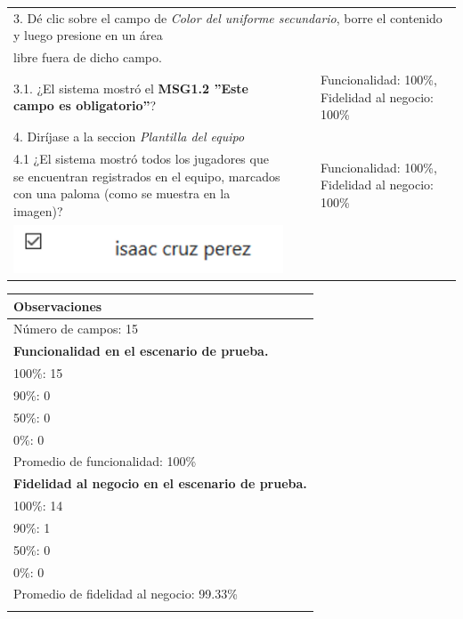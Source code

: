 \documentclass[oneside,10pt]{book}
\begin{document}
\begin{tabularx}{\textwidth}{ X l l X }
\multicolumn{4}{|l|}{3. Dé clic sobre el campo de \textit{Color del uniforme secundario}, borre el contenido y luego presione en un área}              \\
\multicolumn{4}{|l|}{libre fuera de dicho campo.}              \\ \hline
\multicolumn{1}{|X|}{3.1. ¿El sistema mostró el \textbf{MSG1.2 ''Este campo es obligatorio''}?} & \multicolumn{1}{l|}{}   & \multicolumn{1}{l|}{}   & \multicolumn{1}{X|}{Funcionalidad: 100\%, Fidelidad al negocio: 100\%}              \\ \hline

\multicolumn{4}{|l|}{4. Diríjase a la seccion \textit{Plantilla del equipo}}              \\ \hline
\multicolumn{1}{|X|}{4.1 ¿El sistema mostró todos los jugadores que se encuentran registrados en el equipo, marcados con una paloma (como se muestra en la imagen)?} & \multicolumn{1}{l|}{}   & \multicolumn{1}{l|}{}   & \multicolumn{1}{X|}{Funcionalidad: 100\%, Fidelidad al negocio: 100\%}              \\
\multicolumn{1}{|X|}{\includegraphics[scale=.5]{images/player_selected}} & \multicolumn{1}{l|}{}   & \multicolumn{1}{l|}{}   & \multicolumn{1}{X|}{}              \\ \hline

\end{tabularx}

\begin{tabularx}{\textwidth}{ X }
\multicolumn{1}{X}{\cellcolor[HTML]{9B9B9B}\textbf{Observaciones}} \\ \hline
\multicolumn{1}{|l|}{Número de campos: 15 }	\\
\multicolumn{1}{|l|}{\textbf{Funcionalidad en el escenario de prueba.} }	\\
\multicolumn{1}{|l|}{100\%: 15 }	\\
\multicolumn{1}{|l|}{90\%: 0 }	\\
\multicolumn{1}{|l|}{50\%: 0 }	\\
\multicolumn{1}{|l|}{0\%: 0 }	\\
\multicolumn{1}{|l|}{Promedio de funcionalidad: 100\% }	\\
\multicolumn{1}{|l|}{\textbf{Fidelidad al negocio en el escenario de prueba.} }	\\
\multicolumn{1}{|l|}{100\%: 14 }	\\
\multicolumn{1}{|l|}{90\%: 1 }	\\
\multicolumn{1}{|l|}{50\%: 0 }	\\
\multicolumn{1}{|l|}{0\%: 0 }	\\
\multicolumn{1}{|l|}{Promedio de fidelidad al negocio: 99.33\% }	\\
\multicolumn{1}{|l|}{ }	\\ \hline
\end{tabularx}
\newpage
\end{document}
